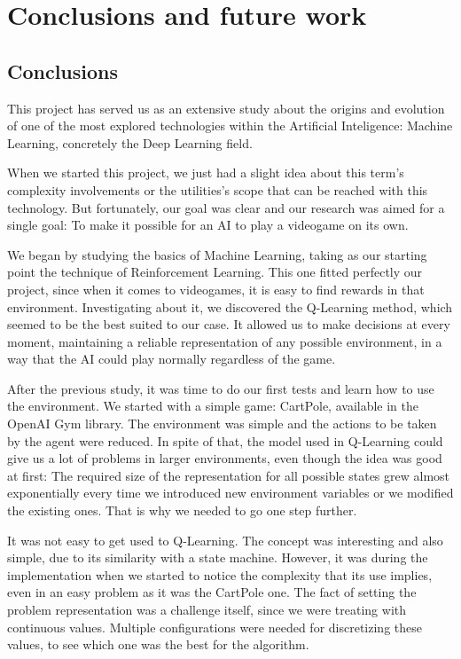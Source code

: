 \chapter{Conclusions and future work}
\label{cap:conclusions}


\section{Conclusions}

This project has served us as an extensive study about the origins and evolution of one of the most explored technologies within the Artificial Inteligence: Machine Learning, concretely the Deep Learning field.

When we started this project, we just had a slight idea about this term's complexity involvements or the utilities's scope that can be reached with this technology. But fortunately, our goal was clear and our research was aimed for a single goal: To make it possible for an AI to play a videogame on its own.

We began by studying the basics of Machine Learning, taking as our starting point the technique of Reinforcement Learning. This one fitted perfectly our project, since when it comes to videogames, it is easy to find rewards in that environment. Investigating about it, we discovered the Q-Learning method, which seemed to be the best suited to our case. It allowed us to make decisions at every moment, maintaining a reliable representation of any possible environment, in a way that the AI could play normally regardless of the game.

After the previous study, it was time to do our first tests and learn how to use the environment. We started with a simple game: CartPole, available in the OpenAI Gym library. The environment was simple and the actions to be taken by the agent were reduced. In spite of that, the model used in Q-Learning could give us a lot of problems in larger environments, even though the idea was good at first: The required size of the representation for all possible states grew almost exponentially every time we introduced new environment variables or we modified the existing ones. That is why we needed to go one step further. 

It was not easy to get used to Q-Learning. The concept was interesting and also simple, due to its similarity with a state machine. However, it was during the implementation when we started to notice the complexity that its use implies, even in an easy problem as it was the CartPole one. The fact of setting the problem representation was a challenge itself, since we were treating with continuous values. Multiple configurations were needed for discretizing these values, to see which one was the best for the algorithm.

